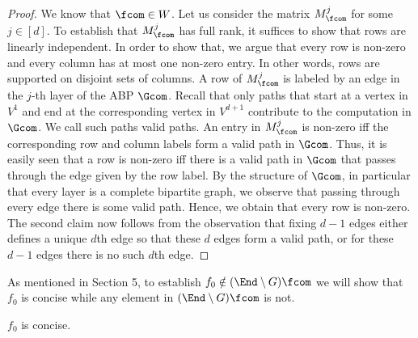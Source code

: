 \begin{proof}
We know that $\fcom\in W$. Let us consider the matrix $M^j_{\fcom}$ for some $j\in[d]$. To establish that $M^j_{\fcom}$ has full rank, it suffices to show that rows are linearly independent. In order to show that, we argue that every row is non-zero and every column has at most one non-zero entry. In other words, rows are supported on disjoint sets of columns.
A row of $M^j_{\fcom}$ is labeled by an edge in the $j$-th layer of the ABP $\Gcom$. Recall that only paths that start at a vertex in $V^1$ and end at the corresponding vertex in $V^{d+1}$ contribute to the computation in $\Gcom$. We call such paths valid paths. An entry in $M^j_{\fcom}$ is non-zero iff the corresponding row and column labels form a valid path in $\Gcom$. Thus, it is easily seen that a row is non-zero iff there is a valid path in $\Gcom$ that passes through the edge given by the row label. By the structure of $\Gcom$, in particular that every layer is a complete bipartite graph, we observe that passing through every edge there is some valid path. Hence, we obtain that every row is non-zero.
The second claim now follows from the observation that fixing $d-1$ edges either defines a unique $d$th edge so that these $d$ edges form a valid path, or for these $d-1$ edges there is no such $d$th edge.
\end{proof}
As mentioned in Section 5, to establish $f_0\notin(\End\setminus G)\fcom$ we will show that $f_0$ is concise while any element in $(\End\setminus G)\fcom$ is not.
\begin{lemma}$f_0$ is concise.\end{lemma}
